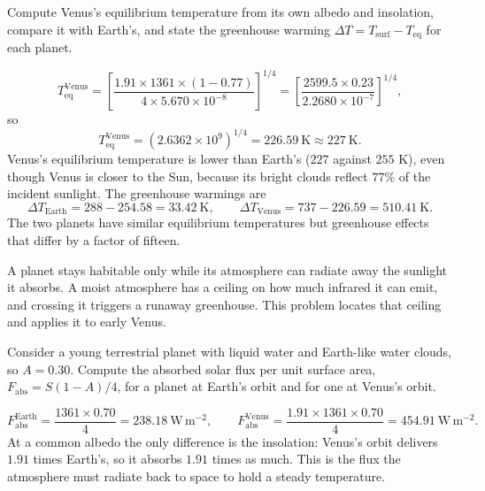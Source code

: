 \parti Compute Venus's equilibrium temperature from its own albedo and insolation,
compare it with Earth's, and state the greenhouse warming $\Delta T = T_\mathrm{surf} - T_\mathrm{eq}$ for each planet.

\begin{solution}
\[
T_\mathrm{eq}^\mathrm{Venus} = \left[\frac{1.91 \times 1361 \times (1 - 0.77)}{4 \times 5.670\times10^{-8}}\right]^{1/4}
= \left[\frac{2599.5 \times 0.23}{2.2680\times10^{-7}}\right]^{1/4},
\]
so
\[
T_\mathrm{eq}^\mathrm{Venus} = \left(2.6362\times10^{9}\right)^{1/4} = 226.59\ \mathrm{K} \approx 227\ \mathrm{K}.
\]
Venus's equilibrium temperature is lower than Earth's ($227$ against $255$ K), even though Venus is closer to the Sun,
because its bright clouds reflect $77\%$ of the incident sunlight.
The greenhouse warmings are
\[
\Delta T_\mathrm{Earth} = 288 - 254.58 = 33.42\ \mathrm{K},
\qquad
\Delta T_\mathrm{Venus} = 737 - 226.59 = 510.41\ \mathrm{K}.
\]
The two planets have similar equilibrium temperatures but greenhouse effects that differ by a factor of fifteen.
\end{solution}


A planet stays habitable only while its atmosphere can radiate away the sunlight it absorbs.
A moist atmosphere has a ceiling on how much infrared it can emit, and crossing it triggers a runaway greenhouse.
This problem locates that ceiling and applies it to early Venus.

\parti Consider a young terrestrial planet with liquid water and Earth-like water clouds, so $A = 0.30$.
Compute the absorbed solar flux per unit surface area, $F_\mathrm{abs} = S(1-A)/4$,
for a planet at Earth's orbit and for one at Venus's orbit.

\begin{solution}
\[
F_\mathrm{abs}^\mathrm{Earth} = \frac{1361 \times 0.70}{4} = 238.18\ \mathrm{W\,m^{-2}},
\qquad
F_\mathrm{abs}^\mathrm{Venus} = \frac{1.91 \times 1361 \times 0.70}{4} = 454.91\ \mathrm{W\,m^{-2}}.
\]
At a common albedo the only difference is the insolation: Venus's orbit delivers $1.91$ times Earth's, so it absorbs $1.91$ times as much.
This is the flux the atmosphere must radiate back to space to hold a steady temperature.
\end{solution}

